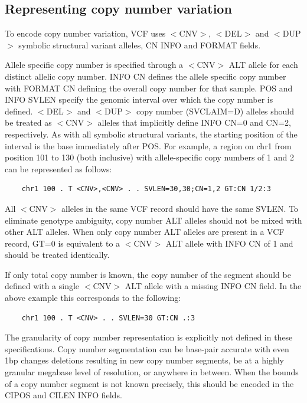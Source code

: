 \documentclass[8pt]{article}
\begin{document}
\pagebreak
\subsection{Representing copy number variation}
\label{cnv}

To encode copy number variation, VCF uses $<$CNV$>$, $<$DEL$>$ and $<$DUP$>$ symbolic structural variant alleles, CN INFO and FORMAT fields.

Allele specific copy number is specified through a $<$CNV$>$ ALT allele for each distinct allelic copy number.
INFO CN defines the allele specific copy number with FORMAT CN defining the overall copy number for that sample.
POS and INFO SVLEN specify the genomic interval over which the copy number is defined.
$<$DEL$>$ and $<$DUP$>$ copy number (SVCLAIM=D) alleles should be treated as $<$CNV$>$ alleles that implicitly define INFO CN=0 and CN=2, respectively.
As with all symbolic structural variants, the starting position of the interval is the base immediately after POS.
For example, a region on chr1 from position 101 to 130 (both inclusive) with allele-specific copy numbers of 1 and 2 can be represented as follows:

\footnotesize
\begin{verbatim}
	chr1 100 . T <CNV>,<CNV> . . SVLEN=30,30;CN=1,2 GT:CN 1/2:3
\end{verbatim}
\normalsize

All $<$CNV$>$ alleles in the same VCF record should have the same SVLEN.
To eliminate genotype ambiguity, copy number ALT alleles should not be mixed with other ALT alleles.
When only copy number ALT alleles are present in a VCF record, GT=0 is equivalent to a $<$CNV$>$ ALT allele with INFO CN of 1 and should be treated identically.

If only total copy number is known, the copy number of the segment should be defined with a single $<$CNV$>$ ALT allele with a missing INFO CN field.
In the above example this corresponds to the following:

\footnotesize
\begin{verbatim}
	chr1 100 . T <CNV> . . SVLEN=30 GT:CN .:3
\end{verbatim}
\normalsize

The granularity of copy number representation is explicitly not defined in these specifications.
Copy number segmentation can be base-pair accurate with even 1bp changes deletions resulting in new copy number segments, be at a highly granular megabase level of resolution, or anywhere in between.
When the bounds of a copy number segment is not known precisely, this should be encoded in the CIPOS and CILEN INFO fields.
\end{document}

